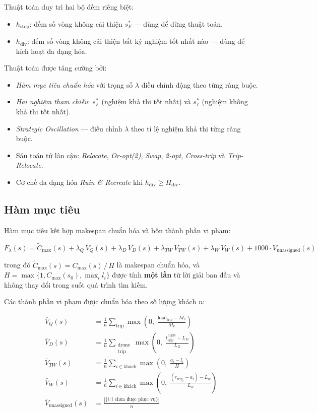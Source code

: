 \documentclass[../DoAn.tex]{subfiles}
\begin{document}
Thuật toán duy trì hai bộ đếm riêng biệt:
\begin{itemize}
    \item $h_{\text{stop}}$: đếm số vòng không cải thiện $s^*_F$ --- dùng để dừng thuật toán.
    \item $h_{\text{div}}$: đếm số vòng không cải thiện bất kỳ nghiệm tốt nhất nào --- dùng để kích hoạt đa dạng hóa.
\end{itemize}

Thuật toán được tăng cường bởi:
\begin{itemize}
    \item \textit{Hàm mục tiêu chuẩn hóa} với trọng số $\lambda$ điều chỉnh động theo từng ràng buộc.
    \item \textit{Hai nghiệm tham chiếu}: $s^*_F$ (nghiệm khả thi tốt nhất) và $s^*_I$ (nghiệm không khả thi tốt nhất).
    \item \textit{Strategic Oscillation} --- điều chỉnh $\lambda$ theo tỉ lệ nghiệm khả thi từng ràng buộc.
    \item Sáu toán tử lân cận: \textit{Relocate}, \textit{Or-opt(2)}, \textit{Swap}, \textit{2-opt}, \textit{Cross-trip} và \textit{Trip-Relocate}.
    \item Cơ chế đa dạng hóa \textit{Ruin \& Recreate} khi $h_{\text{div}} \geq H_{\text{div}}$.
\end{itemize}

\subsection{Hàm mục tiêu}

Hàm mục tiêu kết hợp makespan chuẩn hóa và bốn thành phần vi phạm:

\[
F_\lambda(s) = \tilde{C}_{\max}(s)
             + \lambda_Q\, \bar{V}_Q(s)
             + \lambda_D\, \bar{V}_D(s)
             + \lambda_{TW}\, \bar{V}_{TW}(s)
             + \lambda_W\, \bar{V}_W(s)
             + 1000\cdot \bar{V}_{\text{unassigned}}(s)
\]

trong đó $\tilde{C}_{\max}(s) = C_{\max}(s)\,/\,H$ là makespan chuẩn hóa, và $H = \max\!\{1, C_{\max}(s_0), \max_i l_i\}$ được tính \textbf{một lần} từ lời giải ban đầu và không thay đổi trong suốt quá trình tìm kiếm.

Các thành phần vi phạm được chuẩn hóa theo số lượng khách $n$:

\begin{align*}
\bar{V}_Q(s) &= \frac{1}{n}\sum_{\text{trip}}\max\!\!\left(0,\;\frac{\text{load}_{\text{trip}} - M_v}{M_v}\right) \\[4pt]
\bar{V}_D(s) &= \frac{1}{n}\sum_{\substack{\text{drone}\\\text{trip}}}\max\!\!\left(0,\;\frac{t^{\text{flight}}_{\text{trip}} - L_D}{L_D}\right) \\[4pt]
\bar{V}_{TW}(s) &= \frac{1}{n}\sum_{i\in\text{khách}}\max\!\!\left(0,\;\frac{a_i - l_i}{H}\right) \\[4pt]
\bar{V}_W(s) &= \frac{1}{n}\sum_{i\in\text{khách}}\max\!\!\left(0,\;\frac{(r_{\text{trip}_i} - a_i) - L_w}{L_w}\right) \\[4pt]
\bar{V}_{\text{unassigned}}(s) &= \frac{|\{i : i\text{ chưa được phục vụ}\}|}{n}
\end{align*}
\end{document}
